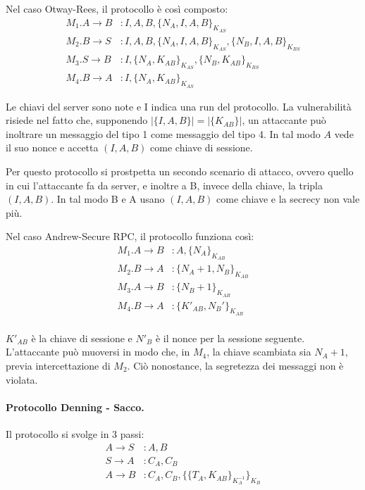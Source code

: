 \documentclass[a4paper, 11pt, twoside]{article}
\begin{document}
	Nel caso Otway-Rees, il protocollo è così composto: \begin{align*}
		M_1. A \to B&: I,A,B, \lbrace N_A, I, A, B\rbrace_{K_{AS}} \\
		M_2. B \to S&: I,A,B, \lbrace N_A, I, A, B\rbrace_{K_{AS}}, \lbrace N_B, I, A, B\rbrace_{K_{BS}} \\
		M_3. S \to B&: I, \lbrace N_A, K_{AB}\rbrace_{K_{AS}}, \lbrace N_B, K_{AB}\rbrace_{K_{BS}}\\
		M_4. B \to A&: I, \lbrace N_A, K_{AB}\rbrace_{K_{AS}}
	\end{align*}

	Le chiavi del server sono note e I indica una run del protocollo.
	La vulnerabilità risiede nel fatto che, supponendo $\vert \lbrace I,A,B\rbrace\vert = \vert\lbrace K_{AB} \rbrace\vert$, un attaccante può inoltrare un messaggio del tipo 1 come messaggio del tipo 4. In tal modo $A$ vede il suo nonce e accetta $(I, A, B)$ come chiave di sessione.

	Per questo protocollo si prostpetta un secondo scenario di attacco, ovvero quello in cui l'attaccante fa da server, e inoltre a B, invece della chiave, la tripla $(I, A, B)$. In tal modo B e A usano $(I, A, B)$ come chiave e la secrecy non vale più.
	
	Nel caso Andrew-Secure RPC, il protocollo funziona così: \begin{align*}
		M_1. A \to B&: A, \lbrace N_A\rbrace_{K_{AB}}\\
		M_2. B \to A&: \lbrace N_A +1, N_B\rbrace_{K_{AB}}\\
		M_3. A \to B&: \lbrace N_B + 1\rbrace_{K_{AB}}\\
		M_4. B \to A&: \lbrace K'_{AB}, N_B'\rbrace_{K_{AB}}\\
	\end{align*}

	$K'_{AB}$ è la chiave di sessione e $N'_B$ è il nonce per la sessione seguente. L'attaccante può muoversi in modo che, in $M_4$, la chiave scambiata sia $N_A + 1$, previa intercettazione di $M_2$. Ciò nonostance, la segretezza dei messaggi non è violata.

	\paragraph{Protocollo Denning - Sacco.}
	Il protocollo si svolge in 3 passi: \begin{align*}
		A\to S&: A, B \\
		S\to A&: C_A, C_B \\
		A \to B&: C_A, C_B, \lbrace\lbrace T_A, K_{AB}\rbrace_{K_A^{-1}}\rbrace_{K_B}
	\end{align*}
\end{document}
